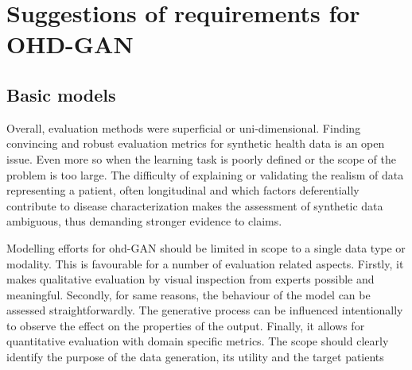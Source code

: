 \section{Suggestions of requirements for OHD-GAN}


\subsection{Basic models}\label{sec:basic}

Overall, evaluation methods were superficial or uni-dimensional. Finding convincing and robust evaluation metrics for synthetic health data is an open issue. Even more so when the learning task is poorly defined or the scope of the problem is too large. The difficulty of explaining or validating the realism of data representing a patient, often longitudinal and which factors deferentially contribute to disease characterization makes the assessment of synthetic data ambiguous, thus demanding stronger evidence to claims.\par
Modelling efforts for \gls{ohd}-GAN should be limited in scope to a single data type or modality. This is favourable for a number of evaluation related aspects. Firstly, it makes qualitative evaluation by visual inspection from experts possible and meaningful. Secondly, for same reasons, the behaviour of the model can be assessed straightforwardly. The generative process can be influenced intentionally to observe the effect on the properties of the output. Finally, it allows for quantitative evaluation with domain specific metrics. The scope should clearly identify the purpose of the data generation, its utility and the target patients\cite{Capobianco2020,Kappen_2016, Kappen_2016a}

